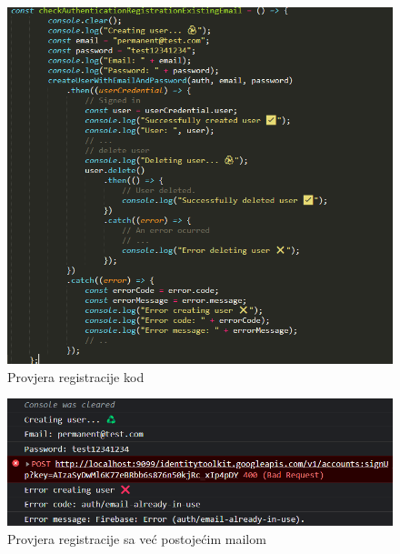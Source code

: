             \begin{figure}[H]
			\includegraphics[scale=0.6]{slike/provjera registracije kod.png}
			\centering
			\caption{Provjera registracije kod }
			\label{fig:promjene}
		          \end{figure}

            \begin{figure}[H]
			\includegraphics[scale=0.6]{slike/provjera registracije s postojecim mailom.png}
			\centering
			\caption{Provjera registracije sa već postojećim mailom}
			\label{fig:promjene}
		          \end{figure}

